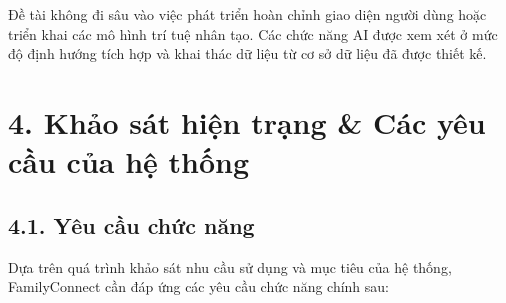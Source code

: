 Đề tài không đi sâu vào việc phát triển hoàn chỉnh giao diện người dùng hoặc triển khai các mô hình trí tuệ nhân tạo. Các chức năng AI được xem xét ở mức độ định hướng tích hợp và khai thác dữ liệu từ cơ sở dữ liệu đã được thiết kế.


\section*{4. Khảo sát hiện trạng \& Các yêu cầu của hệ thống}
{}

\subsection*{4.1. Yêu cầu chức năng}
{}

Dựa trên quá trình khảo sát nhu cầu sử dụng và mục tiêu của hệ thống, FamilyConnect cần đáp ứng các yêu cầu chức năng chính sau:


